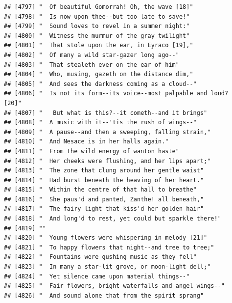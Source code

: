 \documentclass{article}\usepackage[]{graphicx}\usepackage[]{color}
\makeatletter
\newenvironment{kframe}{%
 \def\at@end@of@kframe{}%
 \ifinner\ifhmode%
  \def\at@end@of@kframe{\end{minipage}}%
  \begin{minipage}{\columnwidth}%
 \fi\fi%
 \def\FrameCommand##1{\hskip\@totalleftmargin \hskip-\fboxsep
 \colorbox{shadecolor}{##1}\hskip-\fboxsep
     \hskip-\linewidth \hskip-\@totalleftmargin \hskip\columnwidth}%
 \MakeFramed {\advance\hsize-\width
   \@totalleftmargin\z@ \linewidth\hsize
   \@setminipage}}%
 {\par\unskip\endMakeFramed%
 \at@end@of@kframe}
\newenvironment{knitrout}{}{} %
\makeatother
\begin{document}
\begin{knitrout}
\begin{kframe}
\begin{verbatim}
## [4797] "  Of beautiful Gomorrah! Oh, the wave [18]"                                  
## [4798] "  Is now upon thee--but too late to save!"                                   
## [4799] "  Sound loves to revel in a summer night:"                                   
## [4800] "  Witness the murmur of the gray twilight"                                   
## [4801] "  That stole upon the ear, in Eyraco [19],"                                  
## [4802] "  Of many a wild star-gazer long ago--"                                      
## [4803] "  That stealeth ever on the ear of him"                                      
## [4804] "  Who, musing, gazeth on the distance dim,"                                  
## [4805] "  And sees the darkness coming as a cloud--"                                 
## [4806] "  Is not its form--its voice--most palpable and loud?  [20]"                 
## [4807] "   But what is this?--it cometh--and it brings"                              
## [4808] "  A music with it--'tis the rush of wings--"                                 
## [4809] "  A pause--and then a sweeping, falling strain,"                             
## [4810] "  And Nesace is in her halls again."                                         
## [4811] "  From the wild energy of wanton haste"                                      
## [4812] "  Her cheeks were flushing, and her lips apart;"                             
## [4813] "  The zone that clung around her gentle waist"                               
## [4814] "  Had burst beneath the heaving of her heart."                               
## [4815] "  Within the centre of that hall to breathe"                                 
## [4816] "  She paus'd and panted, Zanthe! all beneath,"                               
## [4817] "  The fairy light that kiss'd her golden hair"                               
## [4818] "  And long'd to rest, yet could but sparkle there!"                          
## [4819] ""                                                                            
## [4820] "  Young flowers were whispering in melody [21]"                              
## [4821] "  To happy flowers that night--and tree to tree;"                            
## [4822] "  Fountains were gushing music as they fell"                                 
## [4823] "  In many a star-lit grove, or moon-light dell;"                             
## [4824] "  Yet silence came upon material things--"                                   
## [4825] "  Fair flowers, bright waterfalls and angel wings--"                         
## [4826] "  And sound alone that from the spirit sprang"                               

\end{verbatim}
\end{kframe}
\end{knitrout}
\end{document}
